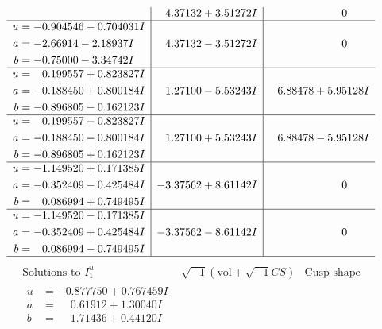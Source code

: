 \documentclass[1p]{elsarticle_modified}
\theoremstyle{definition}
\newcommand{\I}{\sqrt{-1}}
\begin{document}
$$\begin{array}{c|c|c}
 & \phantom{-}4.37132 + 3.51272 I & \phantom{-0.000000 } 0 \\ \hline\begin{aligned}
u &= -0.904546 - 0.704031 I \\
a &= -2.66914 - 2.18937 I \\
b &= -0.75000 - 3.34742 I\end{aligned}
 & \phantom{-}4.37132 - 3.51272 I & \phantom{-0.000000 } 0 \\ \hline\begin{aligned}
u &= \phantom{-}0.199557 + 0.823827 I \\
a &= -0.188450 + 0.800184 I \\
b &= -0.896805 - 0.162123 I\end{aligned}
 & \phantom{-}1.27100 - 5.53243 I & \phantom{-}6.88478 + 5.95128 I \\ \hline\begin{aligned}
u &= \phantom{-}0.199557 - 0.823827 I \\
a &= -0.188450 - 0.800184 I \\
b &= -0.896805 + 0.162123 I\end{aligned}
 & \phantom{-}1.27100 + 5.53243 I & \phantom{-}6.88478 - 5.95128 I \\ \hline\begin{aligned}
u &= -1.149520 + 0.171385 I \\
a &= -0.352409 - 0.425484 I \\
b &= \phantom{-}0.086994 + 0.749495 I\end{aligned}
 & -3.37562 + 8.61142 I & \phantom{-0.000000 } 0 \\ \hline\begin{aligned}
u &= -1.149520 - 0.171385 I \\
a &= -0.352409 + 0.425484 I \\
b &= \phantom{-}0.086994 - 0.749495 I\end{aligned}
 & -3.37562 - 8.61142 I & \phantom{-0.000000 } 0\\
 \hline 
 \end{array}$$\newpage$$\begin{array}{c|c|c}  
\text{Solutions to }I^u_{1}& \I (\text{vol} + \sqrt{-1}CS) & \text{Cusp shape}\\
 \hline 
\begin{aligned}
u &= -0.877750 + 0.767459 I \\
a &= \phantom{-}0.61912 + 1.30040 I \\
b &= \phantom{-}1.71436 + 0.44120 I\end{aligned}

\end{array}$$
\end{document}
